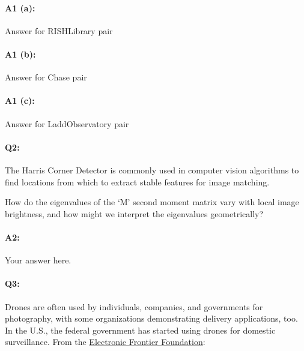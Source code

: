 \paragraph{A1 (a):} Answer for RISHLibrary pair






\pagebreak
\paragraph{A1 (b):} Answer for Chase pair






\pagebreak
\paragraph{A1 (c):} Answer for LaddObservatory pair








\pagebreak
\paragraph{Q2:} 
The Harris Corner Detector is commonly used in computer vision algorithms to find locations from which to extract stable features for image matching. 

How do the eigenvalues of the `M' second moment matrix vary with local image brightness, and how might we interpret the eigenvalues geometrically?

\paragraph{A2:} Your answer here.






\pagebreak
\paragraph{Q3:}
Drones are often used by individuals, companies, and governments for photography, with some organizations demonstrating delivery applications, too. In the U.S., the federal government has started using drones for domestic surveillance. From the \href{https://www.eff.org/issues/surveillance-drones}{Electronic Frontier Foundation}: 
    
